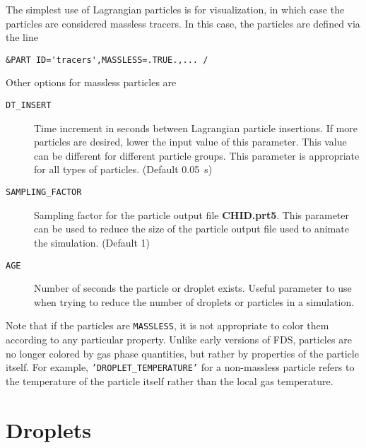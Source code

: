 \documentclass[11pt]{book}
\newcommand{\ct}{\tt\small}
\begin{document}
The simplest use of Lagrangian particles is for visualization, in which case the
particles are considered massless tracers. In this case, the particles are
defined via the line

\footnotesize
\begin{verbatim}
&PART ID='tracers',MASSLESS=.TRUE.,... /
\end{verbatim}
\normalsize

\noindent
Other options for massless particles are
\begin{description}
\item[{\ct DT\_INSERT}]    Time increment in seconds between Lagrangian particle insertions.
If more particles are desired, lower the input value of this parameter. This value can be different
for different particle groups. This parameter is appropriate for all types of particles. (Default 0.05~s)
\item[{\ct SAMPLING\_FACTOR}]     Sampling factor for the particle output
file {\bf CHID.prt5}. This parameter can be used to reduce the size
of the particle output file used to animate the simulation. (Default 1)
\item[{\ct AGE}]  Number of seconds the particle or droplet exists. Useful parameter to use when
trying to reduce the number of droplets or particles in a simulation.
\end{description}
Note that if the
particles are {\ct MASSLESS}, it is not appropriate to color them according to any particular property.
Unlike early versions of FDS, particles are no longer
colored by gas phase quantities, but rather by properties of the particle itself. For example,
{\ct 'DROPLET\_TEMPERATURE'} for a non-massless particle refers to the temperature of the particle itself
rather than the local gas temperature.


\section{Droplets}
\end{document}
